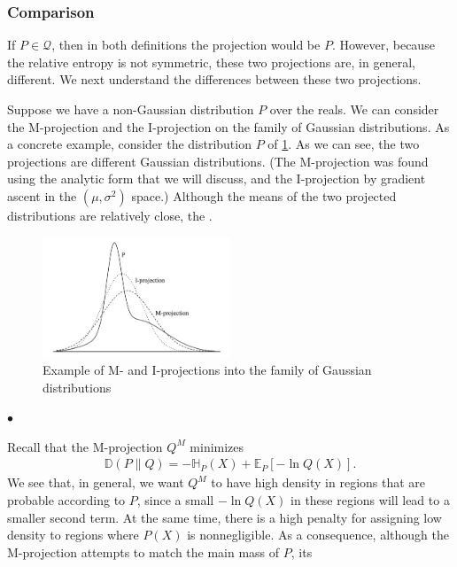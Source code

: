 \documentclass{article}
\begin{document}
\subsubsection{Comparison}
If $P \in \mathcal{Q}$, then in both definitions the projection would be $P$. However, because the relative entropy is not symmetric, these two projections are, in general, different. We next understand the differences between these two projections.

\begin{exma}
Suppose we have a non-Gaussian distribution $P$ over the reals. We can consider the M-projection and the I-projection on the family of Gaussian distributions. As a concrete example, consider the distribution $P$ of \cref{fig:aod2qa}. As we can see, the two projections are different Gaussian distributions. (The M-projection was found using the analytic form that we will discuss, and the I-projection by gradient ascent in the $\left(\mu, \sigma^{2}\right)$ space.) Although the means of the two projected distributions are relatively close, the .
 \begin{figure}[H]
    \centering
    \includegraphics[width=0.5\textwidth]{Figs/a27.png}
    \caption{ Example of M- and I-projections into the family of Gaussian distributions}
    \label{fig:aod2qa}
\end{figure}
$\bullet$ 

Recall that the M-projection $Q^{M}$ minimizes
\begin{align*}
\mathbb{D}(P \| Q)=-\mathbb{H}_{P}(X)+\mathbb{E}_{P}[-\ln Q(X)] .
\end{align*}
We see that, in general, we want $Q^{M}$ to have high density in regions that are probable according to $P$, since a small $-\ln Q(X)$ in these regions will lead to a smaller second term. At the same time, there is a high penalty for assigning low density to regions where $P(X)$ is nonnegligible. As a consequence, although the M-projection attempts to match the main mass of $P$, its 

\end{exma}
\end{document}

